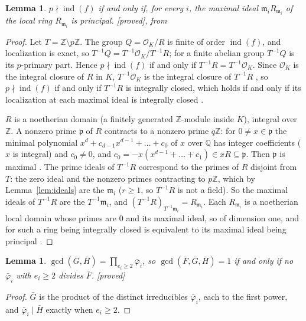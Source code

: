 \documentclass[10pt,a4paper]{article}
\newcommand{\Z}{\mathbb{Z}}
\newcommand{\Q}{\mathbb{Q}}
\newcommand{\OK}{\mathcal{O}_K}
\newcommand{\m}{\mathfrak{m}}
\DeclareMathOperator{\ind}{ind}
\newcommand{\stproved}{\textsf{\small[proved]}\xspace}
\theoremstyle{plain}
\newtheorem{lemma}[proposition]{Lemma}
\theoremstyle{definition}
\begin{document}
\begin{lemma}\label{lem:local}
$p\nmid\ind(f)$ if and only if, for every $i$, the maximal ideal $\m_iR_{\m_i}$ of the local ring $R_{\m_i}$ is principal.
\stproved, from \cite[Prop.~5.12, 5.13, Cor.~5.8, Prop.~9.2]{AM}
\end{lemma}

\begin{proof}
Let $T=\Z\setminus p\Z$.  The group $Q=\OK/R$ is finite of order $\ind(f)$, and localization is exact, so
$T^{-1}Q=T^{-1}\OK/T^{-1}R$; for a finite abelian group $T^{-1}Q$ is its $p$-primary part.  Hence $p\nmid\ind(f)$ if and only if
$T^{-1}R=T^{-1}\OK$.  Since $\OK$ is the integral closure of $R$ in $K$, $T^{-1}\OK$ is the integral closure of $T^{-1}R$
\cite[Prop.~5.12]{AM}, so $p\nmid\ind(f)$ if and only if $T^{-1}R$ is integrally closed, which holds if and only if its localization
at each maximal ideal is integrally closed \cite[Prop.~5.13]{AM}.

$R$ is a noetherian domain (a finitely generated $\Z$-module inside $K$), integral over $\Z$.  A nonzero prime $\mathfrak p$ of $R$
contracts to a nonzero prime $q\Z$: for $0\neq x\in\mathfrak p$ the minimal polynomial $x^d+c_{d-1}x^{d-1}+\dots+c_0$ of $x$ over
$\Q$ has integer coefficients ($x$ is integral) and $c_0\neq0$, and $c_0=-x(x^{d-1}+\dots+c_1)\in xR\subseteq\mathfrak p$.  Then
$\mathfrak p$ is maximal \cite[Cor.~5.8]{AM}.  The prime ideals of $T^{-1}R$ correspond to the primes of $R$ disjoint
from $T$: the zero ideal and the nonzero primes contracting to $p\Z$, which by Lemma~\ref{lem:ideals} are the $\m_i$ ($r\ge1$, so
$T^{-1}R$ is not a field).  So the maximal ideals of $T^{-1}R$ are the $T^{-1}\m_i$, and $(T^{-1}R)_{T^{-1}\m_i}=R_{\m_i}$.  Each
$R_{\m_i}$ is a noetherian local domain whose primes are $0$ and its maximal ideal, so of dimension one, and for such a ring being
integrally closed is equivalent to its maximal ideal being principal \cite[Prop.~9.2]{AM}.
\end{proof}

\begin{lemma}\label{lem:gcd}
$\gcd(\bar G,\bar H)=\prod_{e_i\geq2}\bar\varphi_i$, so $\gcd(\bar F,\bar G,\bar H)=1$ if and only if no $\bar\varphi_i$ with
$e_i\geq2$ divides $\bar F$.  \stproved
\end{lemma}

\begin{proof}
$\bar G$ is the product of the distinct irreducibles $\bar\varphi_i$, each to the first power, and $\bar\varphi_i\mid\bar H$ exactly
when $e_i\geq2$.
\end{proof}
\end{document}
